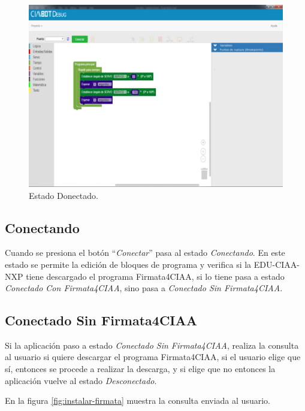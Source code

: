 \begin{figure}[!htbp]
	\begin{center}  %
		\includegraphics[width=15cm]{./Figures/debug-inicio.png}
		\par\caption{Estado Donectado.}\label{fig:desconectado}
	\end{center}
\end{figure}


\subsection{Conectando}
\label{subsec:Conectando}

Cuando se presiona el botón “\emph{Conectar}” pasa al estado \emph{Conectando}. En este estado se permite la edición de bloques de programa y verifica si la EDU-CIAA-NXP tiene descargado el programa Firmata4CIAA, si lo tiene pasa a estado \emph{Conectado Con Firmata4CIAA}, sino pasa a \emph{Conectado Sin Firmata4CIAA}.

\subsection{Conectado Sin Firmata4CIAA}
\label{subsec:Conectado Sin Firmata4CIAA}

Si la aplicación paso a estado \emph{Conectado Sin Firmata4CIAA}, realiza la consulta al usuario si quiere descargar el programa Firmata4CIAA, si el usuario elige que sí, entonces se procede a realizar la descarga, y si elige que no entonces la aplicación vuelve al estado \emph{Desconectado}.

En la figura \ref{fig:instalar-firmata} muestra la consulta enviada al usuario.

